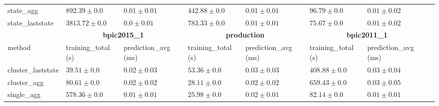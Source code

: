 \begin{table}[!htbp]
{\begin{tabular}{llllllll}
				 state\_agg & $892.39 \pm 0.0$ & $0.01 \pm 0.01$ & $442.88 \pm 0.0$ & $0.01 \pm 0.01$ & $96.79 \pm 0.0$ & $0.01 \pm 0.02$ \\ 
				 state\_laststate & $3813.72 \pm 0.0$ & $\mathbf{0.0 \pm 0.01}$ & $783.33 \pm 0.0$ & $0.01 \pm 0.01$ & $75.67 \pm 0.0$ & $0.01 \pm 0.02$ \\ 
				 \bottomrule
				 \toprule
				 & \multicolumn{2}{c}{{\bfseries bpic2015\_1}} & \multicolumn{2}{c}{{\bfseries production}} & \multicolumn{2}{c}{{\bfseries bpic2011\_1}} \\ \cmidrule(lr){2-3} \cmidrule(lr){4-5} \cmidrule(lr){6-7}
				 method  & training\_total (s) & prediction\_avg (ms) & training\_total (s) & prediction\_avg (ms) & training\_total (s) & prediction\_avg (ms) \\ \midrule
				 cluster\_laststate & $39.51 \pm 0.0$ & $0.02 \pm 0.03$ & $53.36 \pm 0.0$ & $0.03 \pm 0.03$ & $408.88 \pm 0.0$ & $0.03 \pm 0.04$ \\ 
				 cluster\_agg & $80.61 \pm 0.0$ & $0.02 \pm 0.02$ & $28.11 \pm 0.0$ & $0.02 \pm 0.02$ & $659.43 \pm 0.0$ & $0.03 \pm 0.05$ \\ 
				 single\_agg & $578.36 \pm 0.0$ & $0.01 \pm 0.01$ & $25.98 \pm 0.0$ & $0.02 \pm 0.01$ & $82.14 \pm 0.0$ & $0.01 \pm 0.01$ \\ 
				 

\end{tabular}}
\end{table}
